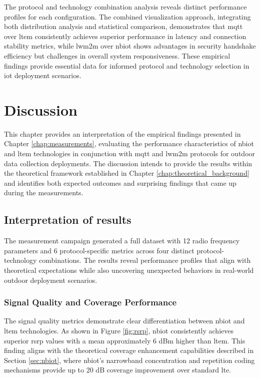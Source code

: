 \documentclass[12pt, english, openany]{book}
\begin{document}
The protocol and technology combination analysis reveals distinct performance profiles for each configuration. The combined visualization approach, integrating both distribution analysis and statistical comparison, demonstrates that \gls{mqtt} over \gls{ltem} consistently achieves superior performance in latency and connection stability metrics, while \gls{lwm2m} over \gls{nbiot} shows advantages in security handshake efficiency but challenges in overall system responsiveness. These empirical findings provide essential data for informed protocol and technology selection in \gls{iot} deployment scenarios.

\chapter{Discussion} \label{chap:discussion}

This chapter provides an interpretation of the empirical findings presented in Chapter \ref{chap:measurements}, evaluating the performance characteristics of \gls{nbiot} and \gls{ltem} technologies in conjunction with \gls{mqtt} and \gls{lwm2m} protocols for outdoor data collection deployments. The discussion intends to provide the results within the theoretical framework established in Chapter \ref{chap:theoretical_background} and identifies both expected outcomes and surprising findings that came up during the measurements.

\section{Interpretation of results} \label{sec:interpretation_of_results}

The measurement campaign generated a full dataset with 12 radio frequency parameters and 6 protocol-specific metrics across four distinct protocol-technology combinations. The results reveal performance profiles that align with theoretical expectations while also uncovering unexpected behaviors in real-world outdoor deployment scenarios.

\subsection{Signal Quality and Coverage Performance}

The signal quality metrics demonstrate clear differentiation between \gls{nbiot} and \gls{ltem} technologies. As shown in Figure \ref{fig:rsrp}, \gls{nbiot} consistently achieves superior \gls{rsrp} values with a mean approximately 6 dBm higher than \gls{ltem}. This finding aligns with the theoretical coverage enhancement capabilities described in Section \ref{sec:nbiot}, where \gls{nbiot}'s narrowband concentration and repetition coding mechanisms provide up to 20 dB coverage improvement over standard \gls{lte}.
\end{document}
